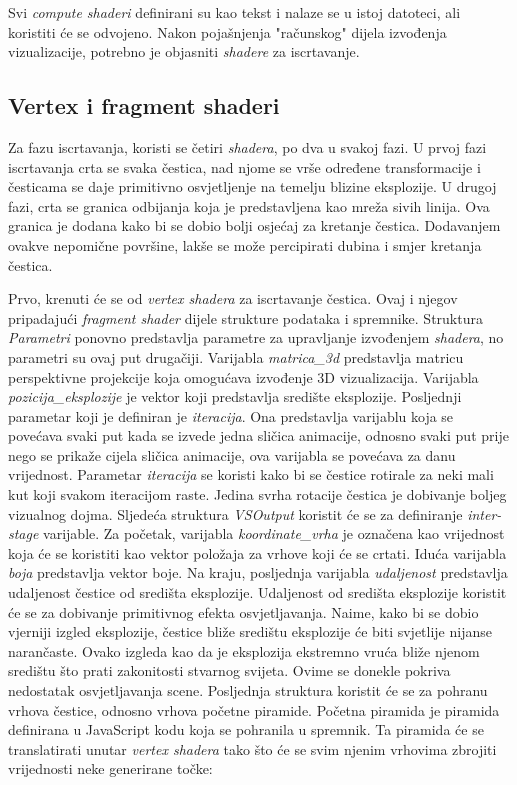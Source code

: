 \documentclass{foi}
\begin{document}
Svi \textit{compute shaderi} definirani su kao tekst i nalaze se u istoj datoteci, ali koristiti će se odvojeno. Nakon pojašnjenja "računskog" dijela izvođenja vizualizacije, potrebno je objasniti \textit{shadere} za iscrtavanje. 
	
\subsection{Vertex i fragment shaderi}
Za fazu iscrtavanja, koristi se četiri \textit{shadera}, po dva u svakoj fazi. U prvoj fazi iscrtavanja crta se svaka čestica, nad njome se vrše određene transformacije i česticama se daje primitivno osvjetljenje na temelju blizine eksplozije. U drugoj fazi, crta se granica odbijanja koja je predstavljena kao mreža sivih linija. Ova granica je dodana kako bi se dobio bolji osjećaj za kretanje čestica. Dodavanjem ovakve nepomične površine, lakše se može percipirati dubina i smjer kretanja čestica.  

Prvo, krenuti će se od \textit{vertex shadera} za iscrtavanje čestica. Ovaj i njegov pripadajući \textit{fragment shader} dijele strukture podataka i spremnike. Struktura \textit{Parametri} ponovno predstavlja parametre za upravljanje izvođenjem \textit{shadera}, no parametri su ovaj put drugačiji. Varijabla \textit{matrica\_3d} predstavlja matricu perspektivne projekcije koja omogućava izvođenje 3D vizualizacija. Varijabla \textit{pozicija\_eksplozije} je vektor koji predstavlja središte eksplozije. Posljednji parametar koji je definiran je \textit{iteracija}. Ona predstavlja varijablu koja se povećava svaki put kada se izvede jedna sličica animacije, odnosno svaki put prije nego se prikaže cijela sličica animacije, ova varijabla se povećava za danu vrijednost. Parametar \textit{iteracija} se koristi kako bi se čestice rotirale za neki mali kut koji svakom iteracijom raste. Jedina svrha rotacije čestica je dobivanje boljeg vizualnog dojma. Sljedeća struktura \textit{VSOutput} koristit će se za definiranje \textit{inter-stage} varijable. Za početak, varijabla \textit{koordinate\_vrha} je označena kao vrijednost koja će se koristiti kao vektor položaja za vrhove koji će se crtati. Iduća varijabla \textit{boja} predstavlja vektor boje. Na kraju, posljednja varijabla \textit{udaljenost} predstavlja udaljenost čestice od središta eksplozije. Udaljenost od središta eksplozije koristit će se za dobivanje primitivnog efekta osvjetljavanja. Naime, kako bi se dobio vjerniji izgled eksplozije, čestice bliže središtu eksplozije će biti svjetlije nijanse narančaste. Ovako izgleda kao da je eksplozija ekstremno vruća bliže njenom središtu što prati zakonitosti stvarnog svijeta. Ovime se donekle pokriva nedostatak osvjetljavanja scene. Posljednja struktura koristit će se za pohranu vrhova čestice, odnosno vrhova početne piramide. Početna piramida je piramida definirana u JavaScript kodu koja se pohranila u spremnik. Ta piramida će se translatirati unutar \textit{vertex shadera} tako što će se svim njenim vrhovima zbrojiti vrijednosti neke generirane točke:
\end{document}
